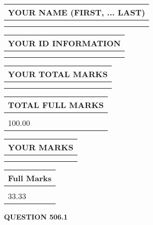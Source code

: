 \documentclass{ctexart}
\begin{document}
   
   
   
\newpage 
\setcounter{page}{ 
   506001 } 
   
   
   
   
\noindent\begin{tabular}{|l|}
\hline
YOUR NAME (FIRST, ... LAST)  \\
\hline
 \\ 
 \\ 
\hline
\end{tabular}
\hspace{0.05in} \begin{tabular}{|l|}
\hline
 YOUR   ID   INFORMATION  \\
\hline
 \\ 
 \\ 
\hline
\end{tabular}
   
   
\vspace{0.2in}\noindent\begin{tabular}{|l|}
\hline
YOUR TOTAL MARKS  \\
\hline
 \\ 
 \\ 
\hline
\end{tabular}
\hspace{0.05in} \begin{tabular}{|l|}
\hline
TOTAL FULL MARKS  \\
\hline
 \\ 
100.00 \\
\hline
\end{tabular}
   
   
 \vspace{0.2in}
 
 
 
 
   
   
  
\vspace{0.2in}
  
\noindent\begin{tabular}{|l|}
\hline
 YOUR MARKS  \\
\hline
 \\ 
 \\ 
\hline
\end{tabular}
\hspace{0.05in} \begin{tabular}{|l|}
\hline
 Full Marks  \\
\hline
 \\ 
33.33 \\
\hline
\end{tabular}
{\textbf{\Large{QUESTION
506.1 
}}}
  
\end{document}
